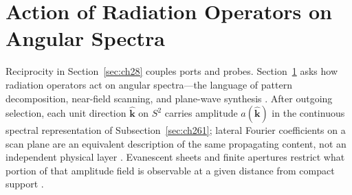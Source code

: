\section{Action of Radiation Operators on Angular Spectra}
\label{sec:ch29}
Reciprocity in Section~\ref{sec:ch28} couples ports and probes. Section~\ref{sec:ch29} asks how
radiation operators act on angular spectra---the language of pattern decomposition, near-field
scanning, and plane-wave synthesis \cite{jackson1999}. After outgoing selection, each unit direction $\widehat{\mathbf{k}}$ on $S^2$ carries amplitude
$a(\widehat{\mathbf{k}})$ in the continuous spectral representation of
Subsection~\ref{sec:ch261}; lateral Fourier coefficients on a scan plane are an equivalent
description of the same propagating content, not an independent physical layer
\cite{jackson1999,stratton1941}. Evanescent sheets and finite apertures restrict what portion of
that amplitude field is observable at a given distance from compact support
\cite{hansen1988,harrington2001}.

